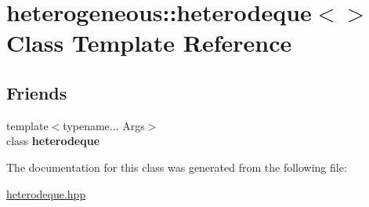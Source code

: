 \hypertarget{classheterogeneous_1_1heterodeque_3_4}{}\section{heterogeneous\+:\+:heterodeque$<$$>$ Class Template Reference}
\label{classheterogeneous_1_1heterodeque_3_4}
\subsection*{Friends}
\begin{DoxyCompactItemize}
\item 
\hypertarget{classheterogeneous_1_1heterodeque_3_4_a3d4800913c2d8380ff48d938c8dfcff5}{}{\footnotesize template$<$typename... Args$>$ }\\class {\bfseries heterodeque}\label{classheterogeneous_1_1heterodeque_3_4_a3d4800913c2d8380ff48d938c8dfcff5}

\end{DoxyCompactItemize}


The documentation for this class was generated from the following file\+:\begin{DoxyCompactItemize}
\item 
\hyperlink{heterodeque_8hpp}{heterodeque.\+hpp}\end{DoxyCompactItemize}
